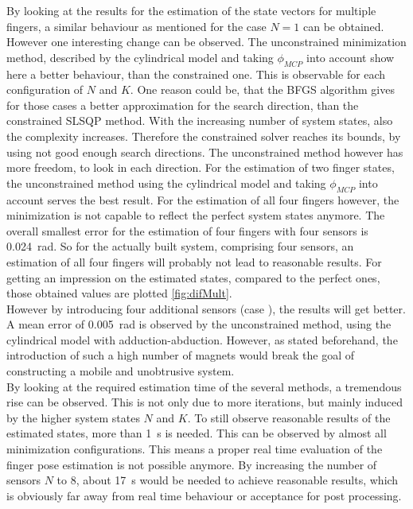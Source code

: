 By looking at the results for the estimation of the state vectors for multiple fingers, a similar behaviour as mentioned for the case $ N = 1 $ can be obtained. However one interesting change can be observed. The unconstrained minimization method, described by the cylindrical model and taking $ \phi_{MCP} $ into account show here a better behaviour, than the constrained one. This is observable for each configuration of $ N $ and $ K $. One reason could be, that the \ac{BFGS} algorithm gives for those cases a better approximation for the search direction, than the constrained \ac{SLSQP} method. With the increasing number of system states, also the complexity increases. Therefore the constrained solver reaches its bounds, by using not good enough search directions. The unconstrained method however has more freedom, to look in each direction. For the estimation of two finger states, the unconstrained method using the cylindrical model and taking $ \phi_{MCP} $ into account serves the best result. For the estimation of all four fingers however, the minimization is not capable to reflect the perfect system states anymore. The overall smallest error for the estimation of four fingers with four sensors is \SI{0.024}{\radian}. So for the actually built system, comprising four sensors, an estimation of all four fingers will probably not lead to reasonable results. For getting an impression on the estimated states, compared to the perfect ones, those obtained values are plotted \ref{fig:difMult}. \\
However by introducing four additional sensors (case  \grqq), the results will get better. A mean error of \SI{0.005}{\radian} is observed by the unconstrained method, using the cylindrical model with adduction-abduction. However, as stated beforehand, the introduction of such a high number of magnets would break the goal of constructing a mobile and unobtrusive system. \\
By looking at the required estimation time of the several methods, a tremendous rise can be observed. This is not only due to more iterations, but mainly induced by the higher system states $ N $ and $ K $. To still observe reasonable results of the estimated states, more than \SI{1}{\second} is needed. This can be observed by almost all minimization configurations. This means a proper real time evaluation of the finger pose estimation is not possible anymore. By increasing the number of sensors $ N $ to 8, about \SI{17}{\second} would be needed to achieve reasonable results, which is obviously far away from real time behaviour or acceptance for post processing. \\

